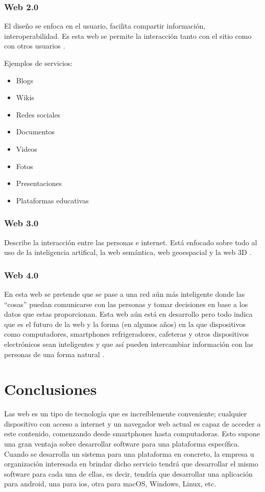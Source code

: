 \documentclass{article}
\begin{document}
\subsubsection{Web 2.0}
El diseño se enfoca en el usuario, facilita compartir información,
interoperabilidad. Es esta web se permite la interacción tanto con el sitio
como con otros usuarios \cite{webs}.

Ejemplos de servicios:
\begin{itemize}
	\item Blogs
	\item Wikis
	\item Redes sociales
	\item Documentos
	\item Videos
	\item Fotos
	\item Presentaciones
	\item Plataformas educativas
\end{itemize}

\subsubsection{Web 3.0}
Describe la interacción entre las personas e internet. Está enfocado sobre todo
al uso de la inteligencia artifical, la web semántica, web geoespacial y la
web 3D \cite{webs}.

\subsubsection{Web 4.0}
En esta web se pretende que se pase a una red aún más inteligente donde las
``cosas'' puedan comunicarse con las personas y tomar decisiones en base a los
datos que estas proporcionan.
Esta web aún está en desarrollo pero todo indica que es el futuro de la web
y la forma (en algunos años) en la que dispositivos como computadores, smartphones
refrigeradores, cafeteras y otros dispositivos electrónicos sean inteligentes
y que así pueden intercambiar información con las personas de una forma natural \cite{webs}.

\section{Conclusiones}
Las web es un tipo de tecnología que es increíblemente conveniente; cualquier
dispositivo con acceso a internet y un navegador web actual es capaz de acceder
a este contenido, comenzando desde smartphones hasta computadoras. Esto
supone una gran ventaja sobre desarrollar software para una plataforma específica.
Cuando se desarrolla un sistema para una plataforma en concreto, la empresa u
organización interesada en brindar dicho servicio tendrá que desarrollar el mismo
software para cada una de ellas, es decir, tendría que desarrollar una
aplicación para android, una para ios, otra para macOS, Windows, Linux, etc.
\end{document}
